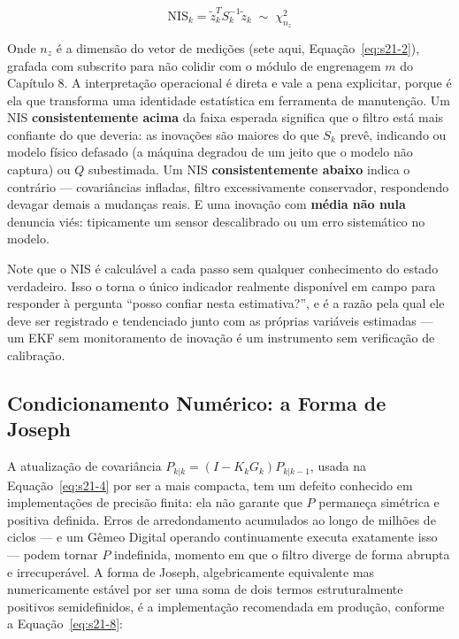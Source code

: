 \documentclass[12pt,a4paper]{article}
\numberwithin{equation}{section}
\numberwithin{table}{section}
\numberwithin{figure}{section}
\begin{document}
{	\begin{equation}\label{eq:s21-7}
	\text{NIS}_k = \tilde{z}_k^T S_k^{-1} \tilde{z}_k \;\sim\; \chi^2_{n_z}
\end{equation}

	Onde $n_z$ é a dimensão do vetor de medições (sete aqui, Equação~\eqref{eq:s21-2}), grafada com subscrito para não colidir com o módulo de engrenagem $m$ do Capítulo 8. A interpretação operacional é direta e vale a pena explicitar, porque é ela que transforma uma identidade estatística em ferramenta de manutenção. Um NIS \textbf{consistentemente acima} da faixa esperada significa que o filtro está mais confiante do que deveria: as inovações são maiores do que $S_k$ prevê, indicando ou modelo físico defasado (a máquina degradou de um jeito que o modelo não captura) ou $Q$ subestimada. Um NIS \textbf{consistentemente abaixo} indica o contrário — covariâncias infladas, filtro excessivamente conservador, respondendo devagar demais a mudanças reais. E uma inovação com \textbf{média não nula} denuncia viés: tipicamente um sensor descalibrado ou um erro sistemático no modelo.

	Note que o NIS é calculável a cada passo sem qualquer conhecimento do estado verdadeiro. Isso o torna o único indicador realmente disponível em campo para responder à pergunta ``posso confiar nesta estimativa?'', e é a razão pela qual ele deve ser registrado e tendenciado junto com as próprias variáveis estimadas — um EKF sem monitoramento de inovação é um instrumento sem verificação de calibração.

	\subsection{Condicionamento Numérico: a Forma de Joseph}

	A atualização de covariância $P_{k|k} = (I - K_k G_k) P_{k|k-1}$, usada na Equação~\eqref{eq:s21-4} por ser a mais compacta, tem um defeito conhecido em implementações de precisão finita: ela não garante que $P$ permaneça simétrica e positiva definida. Erros de arredondamento acumulados ao longo de milhões de ciclos — e um Gêmeo Digital operando continuamente executa exatamente isso — podem tornar $P$ indefinida, momento em que o filtro diverge de forma abrupta e irrecuperável. A forma de Joseph, algebricamente equivalente mas numericamente estável por ser uma soma de dois termos estruturalmente positivos semidefinidos, é a implementação recomendada em produção, conforme a Equação~\eqref{eq:s21-8}:

}
\end{document}
